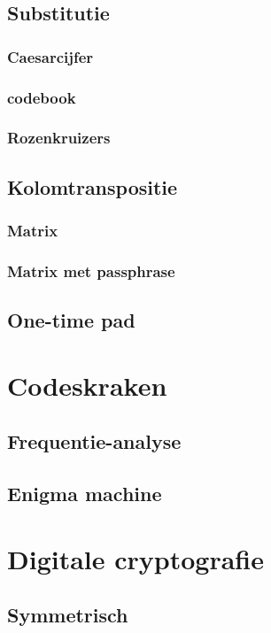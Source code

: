 \documentclass[a4paper,12pt,twoside,openright,titlepage]{book}
\begin{document}
\section{Substitutie}

\subsection{Caesarcijfer}

\subsection{codebook}

\subsection{Rozenkruizers}

\section{Kolomtranspositie}
\subsection{Matrix}

\subsection{Matrix met passphrase}

\section{One-time pad}


\chapter{Codeskraken}
\section{Frequentie-analyse}
\section{Enigma machine}


\chapter{Digitale cryptografie}
\section{Symmetrisch}

\end{document}
